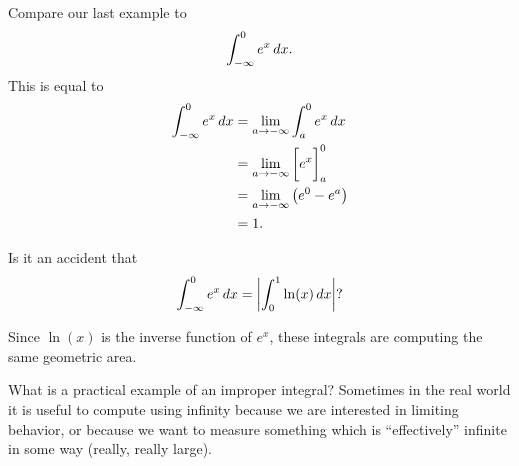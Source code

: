 \documentclass{ximera}
\begin{document}
Compare our last example to
\[
\int_{-\infty}^0 e^x \mathop{}\!d x.
\]
This is equal to
\begin{align*}
  \int_{-\infty}^0 e^x \mathop{}\!d x &= \lim_{a\to -\infty} \int_a^0 e^x \mathop{}\!d x\\
  &= \lim_{a\to-\infty}\bigg[ e^x \bigg]_{a}^0 \\
  &= \lim_{a\to-\infty}\left(e^0 - e^a\right) \\
  &=1.
\end{align*}


\begin{question}
  Is it an accident that
  \[
  \int_{-\infty}^0 e^x \mathop{}\!d x = \left| \int_0^1 \ln(x)\mathop{}\!d x \right|?
  \]
  \begin{prompt}
  \begin{multipleChoice}
  \end{multipleChoice}
  \begin{feedback}
    Since $\ln(x)$ is the inverse function of $e^x$, these integrals
    are computing the same geometric area.
  \end{feedback}
  \end{prompt}
\end{question}


What is a practical example of an improper integral?  Sometimes in the
real world it is useful to compute using infinity because we are
interested in limiting behavior, or because we want to measure
something which is ``effectively'' infinite in some way (really, really
large).
\end{document}
